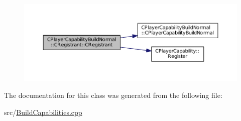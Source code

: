 \begin{figure}[H]
\begin{center}
\leavevmode
\includegraphics[width=350pt]{classCPlayerCapabilityBuildNormal_1_1CRegistrant_af4a7b74e621f41f2ccbadccc7f9a5a57_cgraph}
\end{center}
\end{figure}


The documentation for this class was generated from the following file\+:\begin{DoxyCompactItemize}
\item 
src/\hyperlink{BuildCapabilities_8cpp}{Build\+Capabilities.\+cpp}\end{DoxyCompactItemize}
